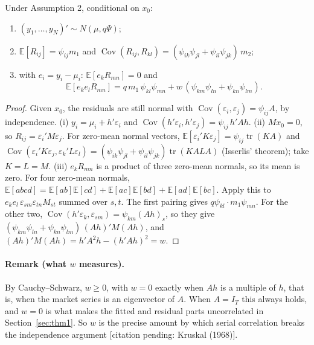 \begin{lemma}\label{lem:serial-moments}
Under Assumption 2, conditional on $x_0$:
\begin{enumerate}
  \item[(i)] $(y_1, \dots, y_N)' \sim N(\mu, q\Psi)$;
  \item[(ii)] $\mathbb{E}[R_{ij}] = \psi_{ij}m_1$ and $\operatorname{Cov}(R_{ij}, R_{kl}) = (\psi_{ik}\psi_{jl} + \psi_{il}\psi_{jk})\,m_2$;
  \item[(iii)] with $e_i = y_i - \mu_i$: $\mathbb{E}[e_kR_{mn}] = 0$ and
  \[
    \mathbb{E}[e_ke_lR_{mn}] = q\,m_1\,\psi_{kl}\psi_{mn} + w\,(\psi_{km}\psi_{ln} + \psi_{kn}\psi_{lm}).
  \]
\end{enumerate}
\end{lemma}

\begin{proof}
Given $x_0$, the residuals are still normal with $\operatorname{Cov}(\varepsilon_i, \varepsilon_j) = \psi_{ij}A$, by independence. (i) $y_i = \mu_i + h'\varepsilon_i$ and $\operatorname{Cov}(h'\varepsilon_i, h'\varepsilon_j) = \psi_{ij}\,h'Ah$. (ii) $Mx_0 = 0$, so $R_{ij} = \varepsilon_i'M\varepsilon_j$. For zero-mean normal vectors, $\mathbb{E}[\varepsilon_i'K\varepsilon_j] = \psi_{ij}\operatorname{tr}(KA)$ and $\operatorname{Cov}(\varepsilon_i'K\varepsilon_j, \varepsilon_k'L\varepsilon_l) = (\psi_{ik}\psi_{jl} + \psi_{il}\psi_{jk})\operatorname{tr}(KALA)$ (Isserlis' theorem); take $K = L = M$. (iii) $e_kR_{mn}$ is a product of three zero-mean normals, so its mean is zero. For four zero-mean normals, $\mathbb{E}[abcd] = \mathbb{E}[ab]\mathbb{E}[cd] + \mathbb{E}[ac]\mathbb{E}[bd] + \mathbb{E}[ad]\mathbb{E}[bc]$. Apply this to $e_ke_l\,\varepsilon_{sm}\varepsilon_{tn}M_{st}$ summed over $s,t$. The first pairing gives $q\psi_{kl}\cdot m_1\psi_{mn}$. For the other two, $\operatorname{Cov}(h'\varepsilon_k, \varepsilon_{sm}) = \psi_{km}(Ah)_s$, so they give $(\psi_{km}\psi_{ln} + \psi_{kn}\psi_{lm})\,(Ah)'M(Ah)$, and $(Ah)'M(Ah) = h'A^2h - (h'Ah)^2 = w$.
\end{proof}

\paragraph{Remark (what $w$ measures).}
By Cauchy--Schwarz, $w \geq 0$, with $w = 0$ exactly when $Ah$ is a multiple of $h$, that is, when the market series is an eigenvector of $A$. When $A = I_T$ this always holds, and $w = 0$ is what makes the fitted and residual parts uncorrelated in Section~\ref{sec:thm1}. So $w$ is the precise amount by which serial correlation breaks the independence argument [citation pending: Kruskal (1968)].

